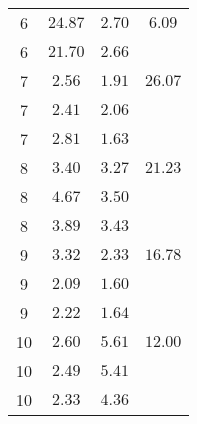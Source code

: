 \begin{table}[H]
\begin{minipage}[t]{0.5\linewidth}
\begin{center}
\begin{tabular}{cccc}
               \midrule
                6 & $24.87$ & $2.70$ & $ 6.09$ \\
                6 & $21.70$ & $2.66$ &         \\
                7 & $ 2.56$ & $1.91$ & $26.07$ \\
                7 & $ 2.41$ & $2.06$ &         \\
                7 & $ 2.81$ & $1.63$ &         \\
                8 & $ 3.40$ & $3.27$ & $21.23$ \\
                8 & $ 4.67$ & $3.50$ &         \\
                8 & $ 3.89$ & $3.43$ &         \\
                9 & $ 3.32$ & $2.33$ & $16.78$ \\
                9 & $ 2.09$ & $1.60$ &         \\
                9 & $ 2.22$ & $1.64$ &         \\
               10 & $ 2.60$ & $5.61$ & $12.00$ \\
               10 & $ 2.49$ & $5.41$ &         \\
               10 & $ 2.33$ & $4.36$ &         \\
               \bottomrule
           \end{tabular}
           \label{tab:220V}
       \end{center}
   \end{minipage}
\end{table}

